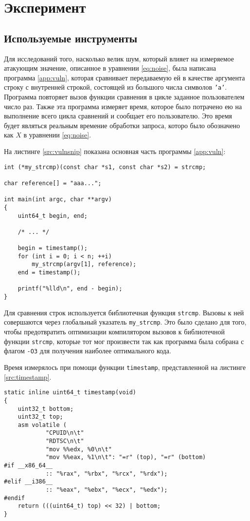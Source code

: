 \section{Эксперимент}

\subsection{Используемые инструменты}

Для исследований того, насколько велик шум, который влияет на измеряемое атакующим значение,
описанное в уравнении \ref{eq:noise}, была написана программа \ref{app:vuln}, которая сравнивает
передаваемую ей в качестве аргумента строку с внутренней строкой, состоящей из большого числа
символов \texttt{'a'}. Программа повторяет вызов функции сравнения в цикле заданное
пользователем число раз. Также эта программа измеряет время, которое было потрачено ею
на выполнение всего цикла сравнений и сообщает его пользователю. Это время будет являться
реальным времение обработки запроса, которо было обозначено как $X$ в уравнении \ref{eq:noise}.

На листинге \ref{src:vulnsnip} показана основная часть программы \ref{app:vuln}:

\begin{lstlisting}
int (*my_strcmp)(const char *s1, const char *s2) = strcmp;

char reference[] = "aaa...";

int main(int argc, char **argv)
{
	uint64_t begin, end;

	/* ... */

	begin = timestamp();
	for (int i = 0; i < n; ++i)
		my_strcmp(argv[1], reference);
	end = timestamp();

	printf("%lld\n", end - begin);
}
\end{lstlisting} \label{src:vulnsnip}

Для сравнения строк используется библиотечная функция \texttt{strcmp}. Вызовы к ней совершаются
через глобальный указатель \texttt{my\_strcmp}. Это было сделано для того, чтобы предотвратить оптимизации
компилятором вызовов к библиотечной функции \texttt{strcmp}, которые тот мог произвести так как программа
была собрана с флагом \texttt{-O3} для получения наиболее оптимального кода.

Время измерялось при помощи функции \texttt{timestamp}, представленной на листинге
\ref{src:timestamp}.

\begin{lstlisting}
static inline uint64_t timestamp(void)
{
	uint32_t bottom;
	uint32_t top;
	asm volatile (
			"CPUID\n\t"
			"RDTSC\n\t"
			"mov %%edx, %0\n\t"
			"mov %%eax, %1\n\t": "=r" (top), "=r" (bottom)
#if __x86_64__
			:: "%rax", "%rbx", "%rcx", "%rdx");
#elif __i386__
			:: "%eax", "%ebx", "%ecx", "%edx");
#endif
	return (((uint64_t) top) << 32) | bottom;
}
\end{lstlisting} \label{src:timestamp}

